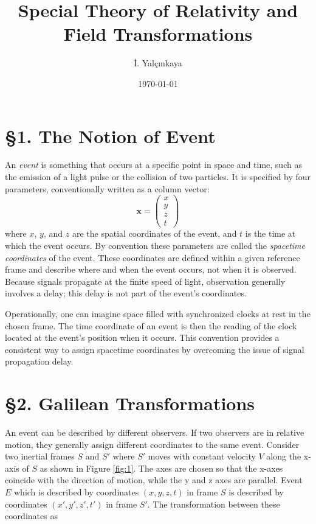 \documentclass[12pt]{article}
\title{Special Theory of Relativity and Field Transformations}
\author{İ. Yalçınkaya}
\date{\today}
\begin{document}
\maketitle

\section*{§1. The Notion of Event}
An \textit{event} is something that occurs at a specific point in space and time, such as the emission of a light pulse or the collision of two particles. It is specified by four parameters, conventionally written as a column vector:
\[
\mathbf{x} = \begin{pmatrix}
x\\
y\\
z\\
t
\end{pmatrix}
\]
where $x$, $y$, and $z$ are the spatial coordinates of the event, and $t$ is the time at which the event occurs. By convention these parameters are called the \textit{spacetime coordinates} of the event. These coordinates are defined within a given reference frame and describe where and when the event occurs, not when it is observed. Because signals propagate at the finite speed of light, observation generally involves a delay; this delay is not part of the event’s coordinates.

Operationally, one can imagine space filled with synchronized clocks at rest in the chosen frame. The time coordinate of an event is then the reading of the clock located at the event’s position when it occurs. This convention provides a consistent way to assign spacetime coordinates by overcoming the issue of signal propagation delay.

\section*{§2. Galilean Transformations}

An event can be described by different observers. If two observers are in relative motion, they generally assign different coordinates to the same event. Consider two inertial frames $S$ and $S'$ where $S'$ moves with constant velocity $V$ along the x-axis of $S$ as shown in Figure \ref{fig:1}. The axes are chosen so that the x-axes coincide with the direction of motion, while the y and z axes are parallel. Event $E$ which is described by coordinates $(x,y,z,t)$ in frame $S$ is described by coordinates $(x',y',z',t')$ in frame $S'$. The transformation between these coordinates as
\end{document}
